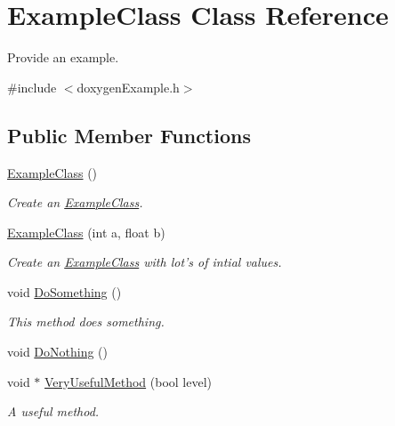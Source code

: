 \hypertarget{classExampleClass}{\section{Example\+Class Class Reference}
\label{classExampleClass}
}


Provide an example.  




{\ttfamily \#include $<$doxygen\+Example.\+h$>$}

\subsection*{Public Member Functions}
\begin{DoxyCompactItemize}
\item 
\hyperlink{classExampleClass_a0d498752f8c3b08addc9461e22e865d9}{Example\+Class} ()
\begin{DoxyCompactList}\small\item\em Create an \hyperlink{classExampleClass}{Example\+Class}. \end{DoxyCompactList}\item 
\hyperlink{classExampleClass_af47c57c9c396eea3efce4a75b33ae3b7}{Example\+Class} (int a, float b)
\begin{DoxyCompactList}\small\item\em Create an \hyperlink{classExampleClass}{Example\+Class} with lot's of intial values. \end{DoxyCompactList}\item 
void \hyperlink{classExampleClass_affeeba4b6ab1cb7e3ee2d38c940234e2}{Do\+Something} ()
\begin{DoxyCompactList}\small\item\em This method does something. \end{DoxyCompactList}\item 
void \hyperlink{classExampleClass_ac65502b1d4a88b27bd7c3c7472cd79e8}{Do\+Nothing} ()
\item 
void $\ast$ \hyperlink{classExampleClass_ac8e89c8b909fdbe54def02098d50341f}{Very\+Useful\+Method} (bool level)
\begin{DoxyCompactList}\small\item\em A useful method. \end{DoxyCompactList}\end{DoxyCompactItemize}
